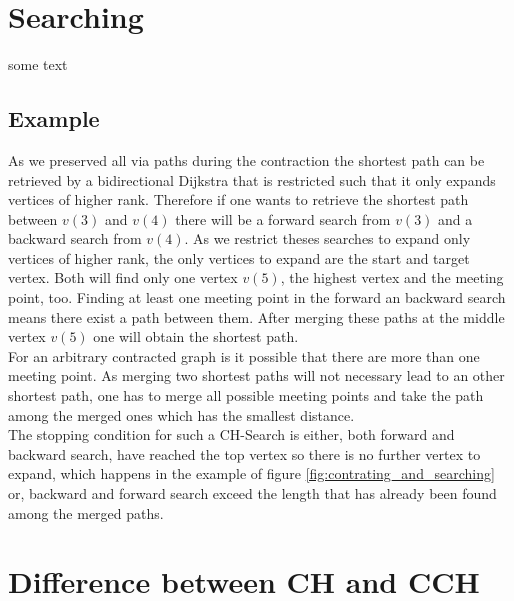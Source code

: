 \section{Searching}



some text

\subsection{Example}

As we preserved all via paths during the contraction the shortest path can be retrieved by a bidirectional Dijkstra that is restricted such that it only expands vertices of higher rank. 
Therefore if one wants to retrieve the shortest path between $v(3)$ and $v(4)$ there will be a forward search from $v(3)$ and a backward search from $v(4)$. As we restrict theses searches to expand only vertices
of higher rank, the only vertices to expand are the start and target vertex. Both will find only one vertex $v(5)$, the highest vertex and the meeting point, too. Finding at least one meeting point in the forward an backward search means there exist a path between them.
After merging these paths at the middle vertex $v(5)$ one will obtain the shortest path.
\\
For an arbitrary contracted graph is it possible that there are more than one meeting point. As merging two shortest paths will not necessary lead to an other shortest path, one has to merge
all possible meeting points and take the path among the merged ones which has the smallest distance. 
\\ 
The stopping condition for such a CH-Search is either, both forward and backward search, have reached the top vertex so there is no further vertex to expand, which happens in the example of figure \ref{fig:contrating_and_searching} or, backward and forward search exceed 
the length that has already been found among the merged paths.


\section{Difference between CH and CCH}

